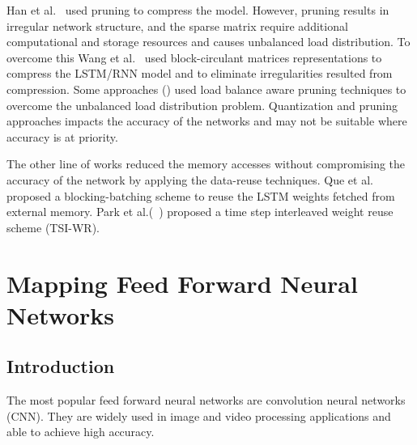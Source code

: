 \documentclass[a4paper,10pt]{article}
\begin{document}
Han et al.~\cite{han2017ese} used pruning to compress the model. However, pruning results in irregular network structure, and the sparse matrix require additional computational and storage resources and causes unbalanced load distribution. To overcome this Wang et al.~\cite{wang2018c} used block-circulant matrices representations to compress the LSTM/RNN model and to eliminate irregularities resulted from compression. Some approaches (\cite{park2019balancing,han2017ese,park2018maximizing}) used load balance aware pruning techniques to overcome the unbalanced load distribution problem. Quantization and pruning approaches impacts the accuracy of the networks and may not be suitable where accuracy is at priority. 

The other line of works reduced the memory accesses without compromising the accuracy of the network by applying the data-reuse techniques. Que et al.~\cite{que2019efficient} proposed a blocking-batching scheme to reuse the LSTM weights fetched from external memory. Park et al.(~\cite{park2020time}) proposed a time step interleaved weight reuse scheme (TSI-WR). 

\section{Mapping Feed Forward Neural Networks}
\subsection{Introduction}
The most popular feed forward neural networks are convolution neural networks (CNN). They are widely used in image and video processing applications and able to achieve high accuracy. 
\end{document}
